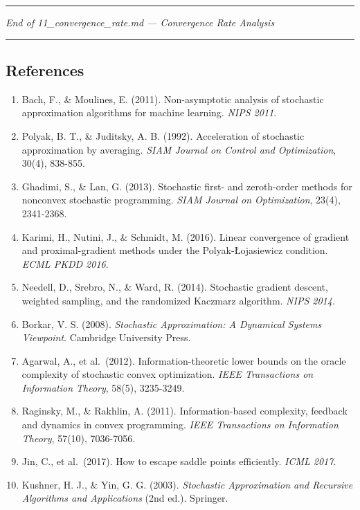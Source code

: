 \documentclass[
  12pt,
]{ctexart}
\providecommand{\tightlist}{%
  \setlength{\itemsep}{0pt}\setlength{\parskip}{0pt}}
\begin{document}
\begin{center}\rule{0.5\linewidth}{0.5pt}\end{center}

\emph{End of 11\_convergence\_rate.md --- Convergence Rate Analysis}

\begin{center}\rule{0.5\linewidth}{0.5pt}\end{center}

\subsection{References}\label{references}

\begin{enumerate}
\def\labelenumi{\arabic{enumi}.}
\tightlist
\item
  Bach, F., \& Moulines, E. (2011). Non-asymptotic analysis of
  stochastic approximation algorithms for machine learning. \emph{NIPS
  2011}.
\item
  Polyak, B. T., \& Juditsky, A. B. (1992). Acceleration of stochastic
  approximation by averaging. \emph{SIAM Journal on Control and
  Optimization}, 30(4), 838-855.
\item
  Ghadimi, S., \& Lan, G. (2013). Stochastic first- and zeroth-order
  methods for nonconvex stochastic programming. \emph{SIAM Journal on
  Optimization}, 23(4), 2341-2368.
\item
  Karimi, H., Nutini, J., \& Schmidt, M. (2016). Linear convergence of
  gradient and proximal-gradient methods under the Polyak-Łojasiewicz
  condition. \emph{ECML PKDD 2016}.
\item
  Needell, D., Srebro, N., \& Ward, R. (2014). Stochastic gradient
  descent, weighted sampling, and the randomized Kaczmarz algorithm.
  \emph{NIPS 2014}.
\item
  Borkar, V. S. (2008). \emph{Stochastic Approximation: A Dynamical
  Systems Viewpoint}. Cambridge University Press.
\item
  Agarwal, A., et al.~(2012). Information-theoretic lower bounds on the
  oracle complexity of stochastic convex optimization. \emph{IEEE
  Transactions on Information Theory}, 58(5), 3235-3249.
\item
  Raginsky, M., \& Rakhlin, A. (2011). Information-based complexity,
  feedback and dynamics in convex programming. \emph{IEEE Transactions
  on Information Theory}, 57(10), 7036-7056.
\item
  Jin, C., et al.~(2017). How to escape saddle points efficiently.
  \emph{ICML 2017}.
\item
  Kushner, H. J., \& Yin, G. G. (2003). \emph{Stochastic Approximation
  and Recursive Algorithms and Applications} (2nd ed.). Springer.
\end{enumerate}
\end{document}
